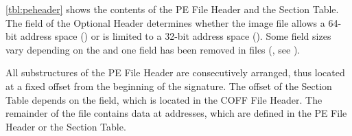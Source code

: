





\autoref{tbl:peheader} shows the contents of the PE File Header and the Section Table. The  field of the Optional Header determines  whether the image file allows a 64-bit address space (\PEplus{}) or is limited to a 32-bit address space (\PEsmall{}). Some field sizes vary depending on the  and one field has been removed in \PEplus{} files (, see \cite[18]{pespec}).

All substructures of the PE File Header are consecutively arranged, thus located at a fixed offset from the beginning of the \PE{} signature. The offset of the Section Table depends on the  field, which is located in the COFF File Header. The remainder of the \PE{} file contains data at addresses, which are defined in the PE File Header or the Section Table. 

